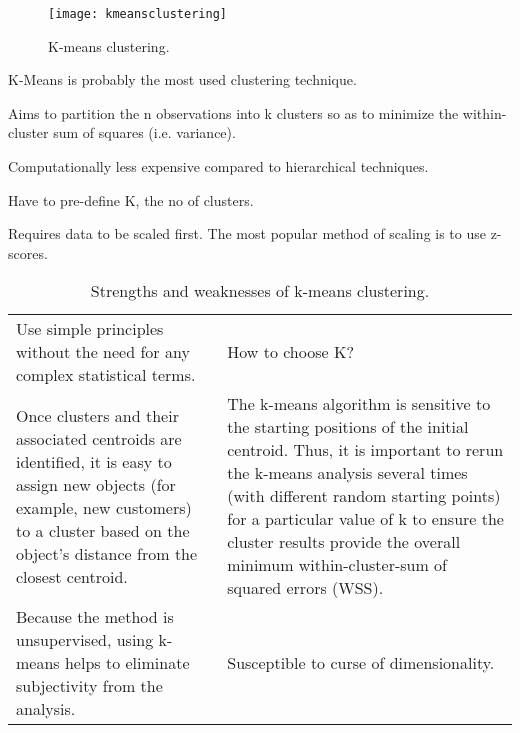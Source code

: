 	\begin{figure}[h]
		\centering
		\texttt{[image: kmeansclustering]}
		\caption[K-means clustering]{K-means clustering.}
		\label{fig:kmeansclustering}
	\end{figure}


	\begin{bulletedlist}
		\item K-Means is probably the most used clustering technique.
		\item Aims to partition the n observations into k clusters so as to minimize the within-cluster sum of squares (i.e. variance).
		\item Computationally less expensive compared to hierarchical techniques.
		\item Have to pre-define K, the no of clusters.
		\item Requires data to be scaled first.  The most popular method of scaling is to use z-scores.
	\end{bulletedlist}


	\begin{table}
        \centering
        \caption[Strengths and weaknesses of k-means clustering]{Strengths and weaknesses of k-means clustering.}
        \label{tab:}
		\begin{tabular}{|p{}|p{}|} \hline
			\tablecolumnheadervlinesone{Strengths} & \tablecolumnheadervlinestwo{Weakness} \\ \hline
			Use simple principles without the need for any complex statistical terms. &
			How to choose K? \\ \hline
			Once clusters and their associated centroids are identified, it is easy to assign new objects (for example, new customers) to a cluster based on the object's distance from the closest centroid. &
			The k-means algorithm is sensitive to the starting positions of the initial centroid. Thus, it is important to rerun the k-means analysis several times (with different random starting points) for a particular value of k to ensure the cluster results provide the overall minimum within-cluster-sum of squared errors (WSS). \\ \hline
			Because the method is unsupervised, using k-means helps to eliminate subjectivity from the analysis. &
			Susceptible to curse of dimensionality. \\ \hline
		\end{tabular}
	\end{table}

